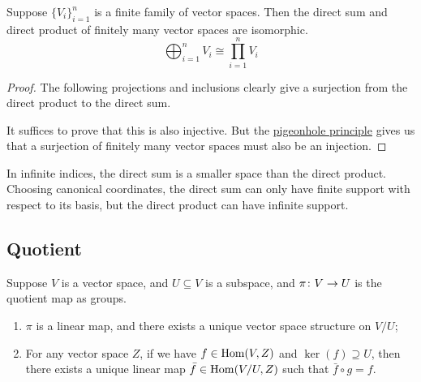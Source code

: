 \begin{theorem}
    Suppose \({\{V_i\}}_{i=1}^n\) is a finite family of vector spaces.
    Then the direct sum and direct product of finitely many vector spaces are isomorphic.
    \begin{equation*}
        \bigoplus_{i=1}^n V_i \cong \prod_{i=1}^n V_i
    \end{equation*}
\end{theorem}
\begin{proof}
    The following projections and inclusions clearly give a surjection
    from the direct product to the direct sum.
    \begin{center}
    \end{center}
    It suffices to prove that this is also injective.
    But the \hyperref[thm:pigeonhole]{pigeonhole principle}
    gives us that a surjection of finitely many vector spaces
    must also be an injection.
\end{proof}

\begin{remark}
    In infinite indices,
    the direct sum is a smaller space than the direct product.
    Choosing canonical coordinates,
    the direct sum can only have finite support with respect to its basis,
    but the direct product can have infinite support.
\end{remark}


\subsection{Quotient}

\begin{proposition}
    Suppose \(V\) is a vector space, and \(U \subseteq V\) is a subspace,
    and \(\pi\colon V\to U\) is the quotient map as groups.
    \begin{enumerate}[label={(\alph*)}, itemsep=0mm]
        \item \(\pi\) is a linear map, and there exists a unique vector space structure on \(V/U\);
        \item For any vector space \(Z\), if we have \(f \in \operatorname{Hom}(V,Z)\) and \(\ker(f) \supseteq U\),
            then there exists a unique linear map \(\bar{f} \in \operatorname{Hom}(V/U,Z)\)
            such that \(\bar{f} \circ g = f\).
    \end{enumerate}
\end{proposition}
